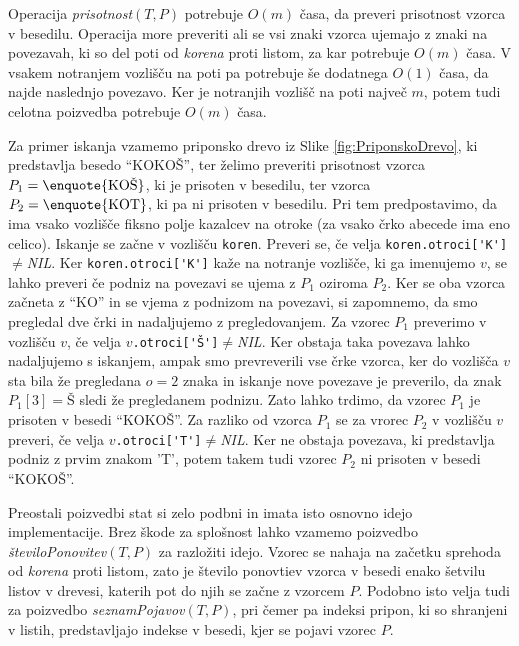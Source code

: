 Operacija \textit{prisotnost}$(T,P)$ potrebuje $O(m)$ časa, da preveri prisotnost vzorca v besedilu. Operacija more preveriti ali se vsi znaki vzorca ujemajo z znaki na povezavah, ki so del poti od \textit{korena} proti listom, za kar potrebuje $O(m)$ časa. V vsakem notranjem vozlišču na poti pa potrebuje še dodatnega $O(1)$ časa, da najde naslednjo povezavo. Ker je notranjih vozlišč na poti največ $m$, potem tudi celotna poizvedba potrebuje $O(m)$ časa.

Za primer iskanja vzamemo priponsko drevo iz Slike \ref{fig:PriponskoDrevo}, ki predstavlja besedo \enquote{KOKOŠ}, ter želimo preveriti prisotnost vzorca $P_1=\text{\enquote{KOŠ}}$, ki je prisoten v besedilu, ter vzorca $P_2=\text{\enquote{KOT}}$, ki pa ni prisoten v besedilu. Pri tem predpostavimo, da ima vsako vozlišče fiksno polje kazalcev na otroke (za vsako črko abecede ima eno celico). Iskanje se začne v vozlišču \verb|koren|. Preveri se, če velja \verb|koren.otroci['K']|$\ne$\textit{NIL}. Ker \verb|koren.otroci['K']| kaže na notranje vozlišče, ki ga imenujemo $v$, se lahko preveri če podniz na povezavi se ujema z $P_1$ oziroma $P_2$. Ker se oba vzorca začneta z \enquote{KO} in se vjema z podnizom na povezavi, si zapomnemo, da smo pregledal dve črki in nadaljujemo z pregledovanjem. Za vzorec $P_1$ preverimo v vozlišču $v$, če velja $v$\verb|.otroci['Š']|$\ne$\textit{NIL}. Ker obstaja taka povezava lahko nadaljujemo s iskanjem, ampak smo prevreverili vse črke vzorca, ker do vozlišča $v$ sta bila že pregledana $o=2$ znaka in iskanje nove povezave je preverilo, da znak $P_1[3]=Š$ sledi že pregledanem podnizu. Zato lahko trdimo, da vzorec $P_1$ je prisoten v besedi \enquote{KOKOŠ}. Za razliko od vzorca $P_1$ se za vrorec $P_2$ v vozlišču $v$ preveri, če velja $v$\verb|.otroci['T']|$\ne$\textit{NIL}. Ker ne obstaja povezava, ki predstavlja podniz z prvim znakom 'T', potem takem tudi vzorec $P_2$ ni prisoten v besedi \enquote{KOKOŠ}.

Preostali poizvedbi stat si zelo podbni in imata isto osnovno idejo implementacije. Brez škode za splošnost lahko vzamemo poizvedbo \textit{številoPonovitev}$(T,P)$ za razložiti idejo. Vzorec se nahaja na začetku sprehoda od \textit{korena} proti listom, zato je število ponovtiev vzorca v besedi enako šetvilu listov v drevesi, katerih pot do njih se začne z vzorcem $P$. Podobno isto velja tudi za poizvedbo \textit{seznamPojavov}$(T,P)$, pri čemer pa indeksi pripon, ki so shranjeni v listih, predstavljajo indekse v besedi, kjer se pojavi vzorec $P$.

